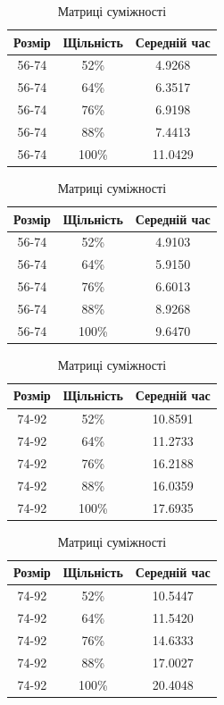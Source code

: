\documentclass[titlepage, a4paper]{article}
\begin{document}
\begin{table}[htbp]
\begin{minipage}[b]{0.5\linewidth}
\begin{tabular}{|c|c|c|}
\hline
Розмір & Щільність & Середній час\\
\hline
56-74 & 52\% & 4.9268 \\
56-74 & 64\% & 6.3517 \\
56-74 & 76\% & 6.9198 \\
56-74 & 88\% & 7.4413 \\
56-74 & 100\% & 11.0429 \\
\hline
\end{tabular}
\caption{Списки суміжності}
\end{minipage}
\begin{minipage}[b]{0.5\linewidth}
\begin{tabular}{|c|c|c|}
\hline
Розмір & Щільність & Середній час\\
\hline
56-74 & 52\% & 4.9103 \\
56-74 & 64\% & 5.9150 \\
56-74 & 76\% & 6.6013 \\
56-74 & 88\% & 8.9268 \\
56-74 & 100\% & 9.6470 \\
\hline
\end{tabular}
\caption{Матриці суміжності}
\end{minipage}
\end{table}
\begin{table}[htbp]
\begin{minipage}[b]{0.5\linewidth}
\begin{tabular}{|c|c|c|}
\hline
Розмір & Щільність & Середній час\\
\hline
74-92 & 52\% & 10.8591 \\
74-92 & 64\% & 11.2733 \\
74-92 & 76\% & 16.2188 \\
74-92 & 88\% & 16.0359 \\
74-92 & 100\% & 17.6935 \\
\hline
\end{tabular}
\caption{Списки суміжності}
\end{minipage}
\begin{minipage}[b]{0.5\linewidth}
\begin{tabular}{|c|c|c|}
\hline
Розмір & Щільність & Середній час\\
\hline
74-92 & 52\% & 10.5447 \\
74-92 & 64\% & 11.5420 \\
74-92 & 76\% & 14.6333 \\
74-92 & 88\% & 17.0027 \\
74-92 & 100\% & 20.4048 \\
\hline
\end{tabular}
\caption{Матриці суміжності}
\end{minipage}
\end{table}
\end{document}
